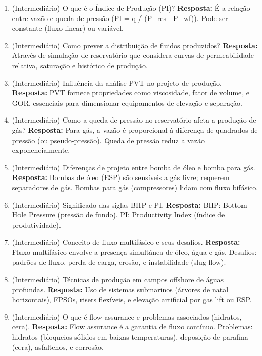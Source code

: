\documentclass[11pt,a4paper]{article}
\begin{document}
\begin{enumerate}
  \item (Intermediário) O que é o Índice de Produção (PI)?
  \textbf{Resposta:} É a relação entre vazão e queda de pressão (PI = q / (P_res - P_wf)). Pode ser constante (fluxo linear) ou variável.

  \item (Intermediário) Como prever a distribuição de fluidos produzidos?
  \textbf{Resposta:} Através de simulação de reservatório que considera curvas de permeabilidade relativa, saturação e histórico de produção.

  \item (Intermediário) Influência da análise PVT no projeto de produção.
  \textbf{Resposta:} PVT fornece propriedades como viscosidade, fator de volume, e GOR, essenciais para dimensionar equipamentos de elevação e separação.

  \item (Intermediário) Como a queda de pressão no reservatório afeta a produção de gás?
  \textbf{Resposta:} Para gás, a vazão é proporcional à diferença de quadrados de pressão (ou pseudo-pressão). Queda de pressão reduz a vazão exponencialmente.

  \item (Intermediário) Diferenças de projeto entre bomba de óleo e bomba para gás.
  \textbf{Resposta:} Bombas de óleo (ESP) são sensíveis a gás livre; requerem separadores de gás. Bombas para gás (compressores) lidam com fluxo bifásico.

  \item (Intermediário) Significado das siglas BHP e PI.
  \textbf{Resposta:} BHP: Bottom Hole Pressure (pressão de fundo). PI: Productivity Index (índice de produtividade).

  \item (Intermediário) Conceito de fluxo multifásico e seus desafios.
  \textbf{Resposta:} Fluxo multifásico envolve a presença simultânea de óleo, água e gás. Desafios: padrões de fluxo, perda de carga, erosão, e instabilidade (slug flow).

  \item (Intermediário) Técnicas de produção em campos offshore de águas profundas.
  \textbf{Resposta:} Uso de sistemas submarinos (árvores de natal horizontais), FPSOs, risers flexíveis, e elevação artificial por gas lift ou ESP.

  \item (Intermediário) O que é flow assurance e problemas associados (hidratos, cera).
  \textbf{Resposta:} Flow assurance é a garantia de fluxo contínuo. Problemas: hidratos (bloqueios sólidos em baixas temperaturas), deposição de parafina (cera), asfaltenos, e corrosão.


\end{enumerate}
\end{document}
